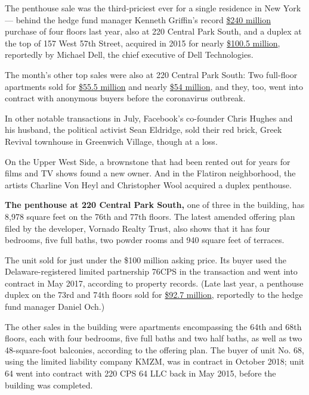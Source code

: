 The penthouse sale was the third-priciest ever for a single residence in
New York --- behind the hedge fund manager Kenneth Griffin's record
\href{https://a836-acris.nyc.gov/DS/DocumentSearch/DocumentDetail?doc_id=2019012400629002}{\$240
million} purchase of four floors last year, also at 220 Central Park
South, and a duplex at the top of 157 West 57th Street, acquired in 2015
for nearly
\href{https://www.nytimes.com/2015/01/25/realestate/100-4-million-dollar-sale-at-one57.html}{\$100.5
million}, reportedly by Michael Dell, the chief executive of Dell
Technologies.

The month's other top sales were also at 220 Central Park South: Two
full-floor apartments sold for
\href{https://a836-acris.nyc.gov/DS/DocumentSearch/DocumentDetail?doc_id=2020072300466001}{\$55.5
million} and nearly
\href{https://a836-acris.nyc.gov/DS/DocumentSearch/DocumentDetail?doc_id=2020072300394001}{\$54
million}, and they, too, went into contract with anonymous buyers before
the coronavirus outbreak.

In other notable transactions in July, Facebook's co-founder Chris
Hughes and his husband, the political activist Sean Eldridge, sold their
red brick, Greek Revival townhouse in Greenwich Village, though at a
loss.

On the Upper West Side, a brownstone that had been rented out for years
for films and TV shows found a new owner. And in the Flatiron
neighborhood, the artists Charline Von Heyl and Christopher Wool
acquired a duplex penthouse.

\textbf{The penthouse at 220 Central Park South,} one of three in the
building, has 8,978 square feet on the 76th and 77th floors. The latest
amended offering plan filed by the developer, Vornado Realty Trust, also
shows that it has four bedrooms, five full baths, two powder rooms and
940 square feet of terraces.

The unit sold for just under the \$100 million asking price. Its buyer
used the Delaware-registered limited partnership 76CPS in the
transaction and went into contract in May 2017, according to property
records. (Late last year, a penthouse duplex on the 73rd and 74th floors
sold for
\href{https://www.nytimes.com/2020/01/03/realestate/the-year-ended-with-another-big-sale-at-220-central-park-south.html}{\$92.7
million}, reportedly to the hedge fund manager Daniel Och.)

The other sales in the building were apartments encompassing the 64th
and 68th floors, each with four bedrooms, five full baths and two half
baths, as well as two 48-square-foot balconies, according to the
offering plan. The buyer of unit No. 68, using the limited liability
company KMZM, was in contract in October 2018; unit 64 went into
contract with 220 CPS 64 LLC back in May 2015, before the building was
completed.

